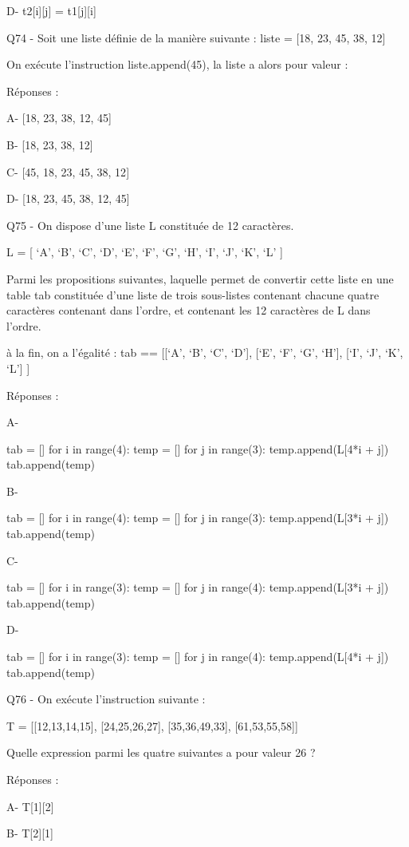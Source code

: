 \documentclass[
]{book}
\begin{document}
D- t2{[}i{]}{[}j{]} = t1{[}j{]}{[}i{]}

Q74 - Soit une liste définie de la manière suivante : liste = {[}18, 23, 45, 38, 12{]}

On exécute l'instruction liste.append(45), la liste a alors pour valeur :

Réponses :

A- {[}18, 23, 38, 12, 45{]}

B- {[}18, 23, 38, 12{]}

C- {[}45, 18, 23, 45, 38, 12{]}

D- {[}18, 23, 45, 38, 12, 45{]}

Q75 - On dispose d'une liste L constituée de 12 caractères.

L = {[} `A', `B', `C', `D', `E', `F', `G', `H', `I', `J', `K', `L' {]}

Parmi les propositions suivantes, laquelle permet de convertir cette liste en une table tab constituée d'une liste de trois sous-listes contenant chacune quatre caractères contenant dans l'ordre, et contenant les 12 caractères de L dans l'ordre.

à la fin, on a l'égalité :
tab == {[}{[}`A', `B', `C', `D'{]},
{[}`E', `F', `G', `H'{]},
{[}`I', `J', `K', `L'{]} {]}

Réponses :

A-

tab = {[}{]}
for i in range(4):
temp = {[}{]}
for j in range(3):
temp.append(L{[}4*i + j{]})
tab.append(temp)

B-

tab = {[}{]}
for i in range(4):
temp = {[}{]}
for j in range(3):
temp.append(L{[}3*i + j{]})
tab.append(temp)

C-

tab = {[}{]}
for i in range(3):
temp = {[}{]}
for j in range(4):
temp.append(L{[}3*i + j{]})
tab.append(temp)

D-

tab = {[}{]}
for i in range(3):
temp = {[}{]}
for j in range(4):
temp.append(L{[}4*i + j{]})
tab.append(temp)

Q76 - On exécute l'instruction suivante :

T = {[}{[}12,13,14,15{]},
{[}24,25,26,27{]},
{[}35,36,49,33{]},
{[}61,53,55,58{]}{]}

Quelle expression parmi les quatre suivantes a pour valeur 26 ?

Réponses :

A- T{[}1{]}{[}2{]}

B- T{[}2{]}{[}1{]}
\end{document}
